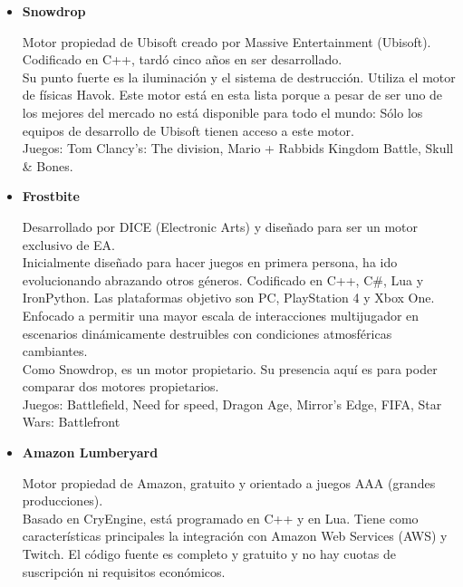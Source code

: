 \begin{itemize}
\item{\textbf{Snowdrop}}

\quad Motor propiedad de Ubisoft creado por Massive Entertainment (Ubisoft). Codificado en C++, tardó cinco años en ser desarrollado.\\

\quad Su punto fuerte es la iluminación y el sistema de destrucción. Utiliza el motor de físicas Havok. Este motor está en esta lista porque a pesar de ser uno de los mejores del mercado no está disponible para todo el mundo: Sólo los equipos de desarrollo de Ubisoft tienen acceso a este motor.\\ 

\quad Juegos: Tom Clancy's: The division, Mario + Rabbids Kingdom Battle, Skull \& Bones.\\

\item{\textbf{Frostbite}}

\quad Desarrollado por DICE (Electronic Arts) y diseñado para ser un motor exclusivo de EA. \\

\quad Inicialmente diseñado para hacer juegos en primera persona, ha ido evolucionando abrazando otros géneros. Codificado en C++, C\#, Lua y IronPython. Las plataformas objetivo son PC, PlayStation 4 y Xbox One. Enfocado a permitir una mayor escala de interacciones multijugador en escenarios dinámicamente destruibles con condiciones atmosféricas cambiantes. \\ 

\quad Como Snowdrop, es un motor propietario. Su presencia aquí es para poder comparar dos motores propietarios. \\

\quad Juegos: Battlefield, Need for speed, Dragon Age, Mirror's Edge, FIFA, Star Wars: Battlefront\\

\item{\textbf{Amazon Lumberyard}}

\quad Motor propiedad de Amazon, gratuito y orientado a juegos AAA (grandes producciones). \\

\quad Basado en CryEngine, está programado en C++ y en Lua. Tiene como características principales la integración con Amazon Web Services (AWS) y Twitch. El código fuente es completo y gratuito y no hay cuotas de suscripción ni requisitos económicos. \\


\end{itemize}
